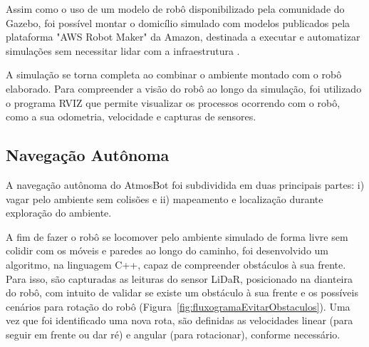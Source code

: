 Assim como o uso de um modelo de robô disponibilizado pela comunidade do Gazebo, foi possível montar o domicílio simulado com modelos publicados pela plataforma "AWS Robot Maker" da Amazon, destinada a executar e automatizar simulações sem necessitar lidar com a infraestrutura \cite{aws, modeloAmbiente}.

A simulação se torna completa ao combinar o ambiente montado com o robô elaborado. Para compreender a visão do robô ao longo da simulação, foi utilizado o programa RVIZ que permite visualizar os processos ocorrendo com o robô, como a sua odometria, velocidade e capturas de sensores.

\subsection{Navegação Autônoma}

A navegação autônoma do AtmosBot foi subdividida em duas principais partes: i) vagar pelo ambiente sem colisões e ii) mapeamento e localização durante exploração do ambiente.

A fim de fazer o robô se locomover pelo ambiente simulado de forma livre sem colidir com os móveis e paredes ao longo do caminho, foi desenvolvido um algoritmo, na linguagem C++, capaz de compreender obstáculos à sua frente. Para isso, são capturadas as leituras do sensor LiDaR, posicionado na dianteira do robô, com intuito de validar se existe um obstáculo à sua frente e os possíveis cenários para rotação do robô (Figura~\ref{fig:fluxogramaEvitarObstaculos}).  Uma vez que foi identificado uma nova rota, são definidas as velocidades linear (para seguir em frente ou dar ré) e angular (para rotacionar), conforme necessário.

